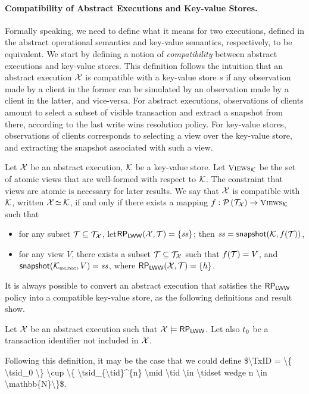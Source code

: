 \paragraph{Compatibility of Abstract Executions and Key-value Stores.}
Formally speaking, we need to define what it means for two executions, defined in the abstract operational semantics and key-value semantics, respectively, 
to be equivalent. We start by defining a notion of \emph{compatibility} between abstract executions and key-value stores. 
This definition follows the intuition that an abstract execution $\mathcal{X}$ is compatible with a key-value store $s$ if 
any observation made by a client in the former can be simulated by an observation made by a client in the latter, and vice-versa. 
For abstract executions, observations of clients amount to select a subset of visible transaction and extract 
a snapshot from there, according to the last write wins resolution policy. For key-value stores, 
observations of clients corresponds to selecting a view over the key-value store, and extracting the snapshot 
associated with such a view.

\begin{definition}
Let $\mathcal{X}$ be an abstract execution, $\mathcal{K}$ be a key-value store. 
Let $\Views_{\hh}$ be the set of atomic views that are well-formed with 
respect to $\mathcal{K}$.
\ac{The constraint that views are atomic is necessary for later results.}
We say that $\mathcal{X}$ is compatible with $\mathcal{K}$, written 
$\mathcal{X} \mathop{\simeq} \mathcal{K}$, if and only if there exists a  mapping 
$f: \powerset{\T_{\aexec}} \rightarrow \Views_{\hh}$
such that  
\begin{itemize}
\item for any subset $\mathcal{T} \subseteq \mathcal{T}_{\mathcal{X}}$, let$\mathsf{RP}_{\mathsf{LWW}}(\mathcal{X}, \mathcal{T}) = \{\mathit{ss}\}$; 
then $\mathit{ss} = \mathsf{snapshot}(\mathcal{K}, f(\mathcal{T}))$, 
\item for any view $V$, there exists a subset $\mathcal{T} \subseteq \mathcal{T}_{\mathcal{X}}$ 
such that $f(\mathcal{T}) = V$, and $\mathsf{snapshot}(\mathcal{K}_{aexec}, V) = \mathit{ss}$, where 
$\mathsf{RP}_{\mathsf{LWW}}(\mathcal{X}, \mathcal{T}) = \{h\}$.
\end{itemize}
\end{definition}

It is always possible to convert an abstract execution that satisfies the $\mathsf{RP}_{\mathsf{LWW}}$ 
policy into a compatible 
key-value store, as the following definitions and result show.
\begin{definition}
Let $\mathcal{X}$ be an abstract execution such that $\mathcal{X} \models \mathsf{RP}_{\mathsf{LWW}}$. 
Let also $t_0$ be a transaction identifier not included in $\mathcal{X}$. 
\end{definition}
\ac{Following this definition, it may be the case that we could define 
$\TxID = \{ \tsid_0 \} \cup \{ \tsid_{\tid}^{n} \mid \tid \in \tidset wedge n \in \mathbb{N}\}$.
}

